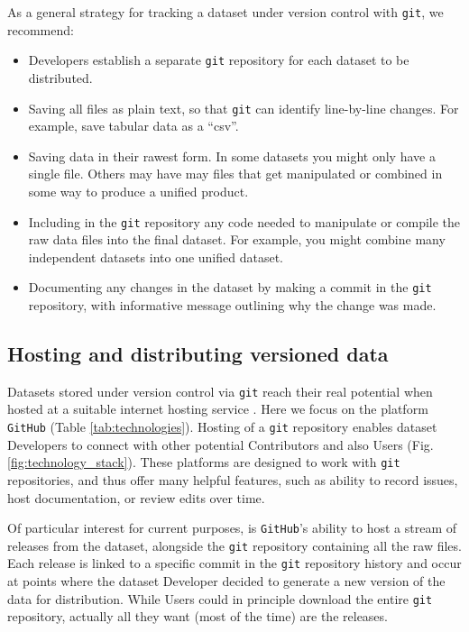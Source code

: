 \documentclass[a4paper,num-refs]{assets/oup-contemporary}
\begin{document}
As a general strategy for tracking a dataset under version control with \texttt{git}, we recommend:
\begin{itemize}
  \item Developers establish a separate \texttt{git} repository for each dataset to be distributed.
  \item Saving all files as plain text, so that \texttt{git} can identify line-by-line changes. For example, save tabular data as a ``csv''.
  \item Saving data in their rawest form. In some datasets you might only have a single file. Others may have may files that get manipulated or combined in some way to produce a unified product.
  \item Including in the \texttt{git} repository any code needed to manipulate or compile the raw data files into the final dataset. For example, you might combine many independent datasets into one unified dataset.
  \item Documenting any changes in the dataset by making a commit in the \texttt{git} repository, with informative message outlining why the change was made.
\end{itemize}


\subsection{Hosting and distributing versioned data}

Datasets stored under version control via \texttt{git} reach their real potential when hosted at a suitable internet hosting service \cite{Ram-2013,Perkel-2016}. Here we focus on the platform \texttt{GitHub} (Table \ref{tab:technologies}). Hosting of a \texttt{git} repository enables dataset Developers to connect with other potential Contributors and also Users (Fig. \ref{fig:technology_stack}). These platforms are designed to work with \texttt{git} repositories, and thus offer many helpful features, such as ability to record issues, host documentation, or review edits over time.

Of particular interest for current purposes, is \texttt{GitHub}'s ability to host a stream of releases from the dataset, alongside the \texttt{git} repository containing all the raw files. Each release is linked to a specific commit in the \texttt{git} repository history and occur at points where the dataset Developer decided to generate a new version of the data for distribution. While Users could in principle download the entire \texttt{git} repository, actually all they want (most of the time) are the releases.
\end{document}
